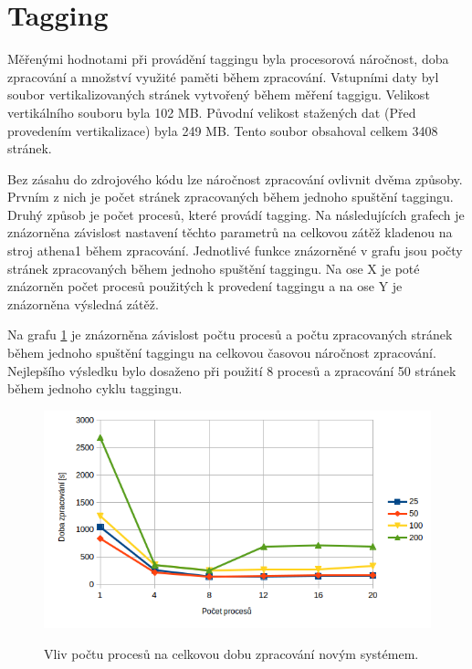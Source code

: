 \section{Tagging}
Měřenými hodnotami při provádění taggingu byla procesorová náročnost, doba zpracování
a množství využité paměti během zpracování. Vstupními daty byl soubor vertikalizovaných stránek
vytvořený během měření taggigu. Velikost vertikálního souboru byla 102 MB. Původní velikost
stažených dat (Před provedením vertikalizace) byla 249 MB. Tento soubor obsahoval celkem
3408 stránek.

Bez zásahu do zdrojového kódu lze náročnost zpracování ovlivnit dvěma způsoby.
Prvním z nich je počet stránek zpracovaných během jednoho spuštění taggingu. Druhý způsob
je počet procesů, které provádí tagging. Na následujících grafech je znázorněna závislost
nastavení těchto parametrů na celkovou zátěž kladenou na stroj athena1 během zpracování.
Jednotlivé funkce znázorněné v grafu jsou počty stránek zpracovaných během jednoho spuštění
taggingu. Na ose X je poté znázorněn počet procesů použitých k provedení taggingu a na
ose Y je znázorněna výsledná zátěž.

Na grafu \ref{graph:graph_tagging_doba_zpracovani} je znázorněna závislost počtu procesů
a počtu zpracovaných stránek během jednoho spuštění taggingu na celkovou časovou náročnost
zpracování. Nejlepšího výsledku bylo dosaženo při použití 8 procesů a zpracování 50
stránek během jednoho cyklu taggingu.

\begin{figure}[H]
    \begin{center}
        \label{graph:graph_tagging_doba_zpracovani}
        \includegraphics[width=1.0\textwidth]{obrazky-figures/graph_tagging_doba_zpracovani.png}
        \caption{Vliv počtu procesů na celkovou dobu zpracování novým systémem.}
    \end{center}
\end{figure}

